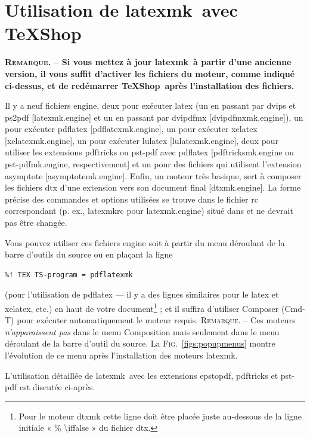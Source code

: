 \documentclass[11pt,french]{article}
\newcommand{\TS}{\textsf{\TeX Shop}}
\newcommand{\latexmk}{\textsf{latexmk}}
\newcommand{\cmdkey}{\textsf{Cmd}}
\newcommand{\mnu}[1]{\textsf{#1}}
\newcommand{\cmd}[1]{\textsf{#1}}
\begin{document}
\section{Utilisation de \latexmk\ avec \TS}%

\noindent\textbf{\textsc{Remarque}. -- Si vous mettez à jour \latexmk\ à partir d'une ancienne version, il vous suffit d'activer les fichiers du moteur, comme indiqué ci-dessus, et de redémarrer \TS\ après l'installation des fichiers.}

Il y a neuf fichiers \cmd{engine}, deux pour exécuter \cmd{latex} (un en passant par \cmd{dvips} et \cmd{ps2pdf} [\cmd{latexmk.engine}] et un en passant par \cmd{dvipdfmx} [\cmd{dvipdfmxmk.engine}]), un pour exécuter \cmd{pdflatex} [\cmd{pdflatexmk.engine}], un pour exécuter \cmd{xelatex} [\cmd{xelatexmk.engine}], un pour exécuter \cmd{lulatex} [\cmd{lulatexmk.engine}], deux pour utiliser les extensions \cmd{pdftricks} ou \cmd{pst-pdf} avec \cmd{pdflatex} [\cmd{pdftricksmk.engine} ou \cmd{pst-pdfmk.engine}, respectivement] et un pour des fichiers qui utilisent l'extension \cmd{asymptote} [\cmd{asymptotemk.engine}]. Enfin, un moteur très basique, sert à composer les fichiers \cmd{dtx} d'une extension vers son document final [\cmd{dtxmk.engine}]. La forme précise des commandes et options utilisées se trouve dans le fichier \cmd{rc} correspondant (p. ex., \cmd{latexmkrc} pour \cmd{latexmk.engine}) situé dans  et ne devrait pas être changée.

Vous pouvez utiliser ces fichiers \cmd{engine} soit à partir du menu déroulant de la barre d'outils du source ou en plaçant la ligne
\begin{verbatim}
%! TEX TS-program = pdflatexmk
\end{verbatim}
(pour l'utilisation de \cmd{pdflatex} --- il y a des lignes similaires pour le \cmd{latex} et \cmd{xelatex}, etc.) en haut de votre document\footnote{Pour le moteur \cmd{dtxmk} cette ligne doit être placée juste au-dessous de la ligne initiale « \cmd{\% \textbackslash iffalse} » du fichier \cmd{dtx}.} ; et il suffira d'utiliser \mnu{Composer} (\cmd{\cmdkey-T}) pour exécuter automatiquement le moteur requis. \textsc{Remarque}. -- Ces moteurs \emph{n'apparaissent pas} dans le menu \mnu{Composition} mais seulement dans le menu déroulant de la barre d'outil du source. La \textsc{Fig.}~\ref{figs:popupmenus} montre l'évolution de ce menu après l'installation des moteurs \latexmk.

L'utilisation détaillée de \latexmk\ avec les extensions \cmd{epstopdf}, \cmd{pdftricks} et \cmd{pst-pdf} est discutée ci-après.
\end{document}
